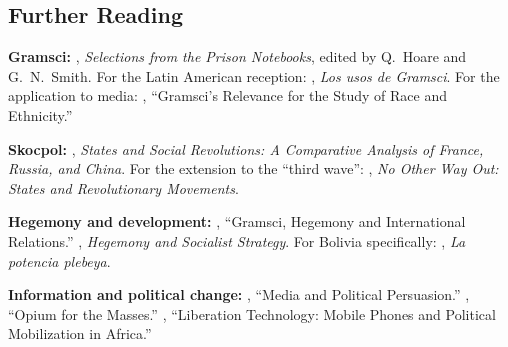 \documentclass[../structural_economics_book.tex]{subfiles}
\begin{document}
\subsection*{Further Reading}

\textbf{Gramsci:} \citet{gramsci1971selections}, \textit{Selections from the Prison Notebooks}, edited by Q.\ Hoare and G.\ N.\ Smith. For the Latin American reception: \citet{portantiero1981usos}, \textit{Los usos de Gramsci}. For the application to media: \citet{hall1986gramsci}, ``Gramsci's Relevance for the Study of Race and Ethnicity.''

\textbf{Skocpol:} \citet{skocpol1979states}, \textit{States and Social Revolutions: A Comparative Analysis of France, Russia, and China}. For the extension to the ``third wave'': \citet{goodwin2001no}, \textit{No Other Way Out: States and Revolutionary Movements}.

\textbf{Hegemony and development:} \citet{cox1983gramsci}, ``Gramsci, Hegemony and International Relations.'' \citet{laclau1985hegemony}, \textit{Hegemony and Socialist Strategy}. For Bolivia specifically: \citet{garcialinera2008potencia}, \textit{La potencia plebeya}.

\textbf{Information and political change:} \citet{enikolopov2011media}, ``Media and Political Persuasion.'' \citet{kern2009opium}, ``Opium for the Masses.'' \citet{manacorda2020liberation}, ``Liberation Technology: Mobile Phones and Political Mobilization in Africa.''
\end{document}
